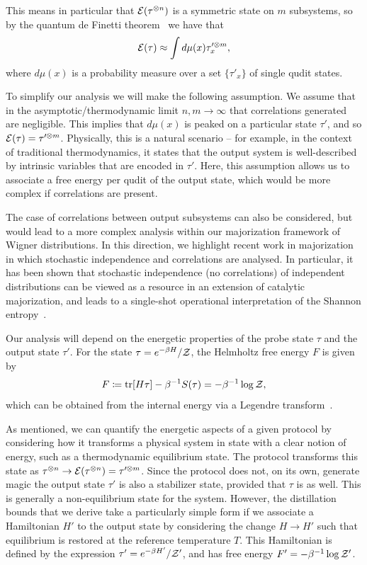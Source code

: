 \documentclass[pra,
aps,
twocolumn,
superscriptaddress,
groupedaddress,
nofootinbib,
reprint
]{revtex4-1}
\begin{document}
This means in particular that ${\mathcal E}(\tau^{\otimes n})$ is a symmetric state on $m$ subsystems, so by the quantum de Finetti theorem~\cite{christandl_2007} we have that
\begin{equation}
{\mathcal E}(\tau) \approx \int d\mu(x) \tau_x^{\prime \otimes m},
\end{equation}
where $d\mu(x)$ is a probability measure over a set $\{\tau'_x\}$ of single qudit states.

To simplify our analysis we will make the following assumption. We assume that in the asymptotic/thermodynamic limit $n,m \rightarrow \infty$ that correlations generated  are negligible. This implies that $d\mu(x)$ is peaked on a particular state $\tau'$, and so ${\mathcal E}(\tau) = \tau^{\prime \otimes m}$. Physically, this is a natural scenario -- for example, in the context of traditional thermodynamics, it states that the output system is well-described by intrinsic variables that are encoded in $\tau'$. Here, this assumption allows us to associate a free energy per qudit of the output state, which would be more complex if correlations are present.

The case of correlations between output subsystems can also be considered, but would lead to a more complex analysis within our majorization framework of Wigner distributions. In this direction, we highlight recent work in majorization in which stochastic independence and correlations are analysed. In particular, it has been shown that stochastic independence (no correlations) of independent distributions can be viewed as a resource in an extension of catalytic majorization, and leads to a single-shot operational interpretation of the Shannon entropy~\cite{muller_2015, muller_2016, muller_2019}.

Our analysis will depend on the energetic properties of the probe state $\tau$ and the output state $\tau'$.
For the state $\tau = e^{-\beta H}/\mathcal{Z}$, the Helmholtz free energy $F$ is given by
\begin{equation}
	F \coloneqq \mbox{tr}[H \tau] - \beta^{-1}S(\tau) = -\beta^{-1}\log{\mathcal{Z}},
\end{equation}
which can be obtained from the internal energy via a Legendre transform~\cite{Pathria_1997}.

As mentioned, we can quantify the energetic aspects of a given protocol by considering how it transforms a physical system in state with a clear notion of energy, such as a thermodynamic equilibrium state. The protocol transforms this state as $\tau^{\otimes n} \rightarrow {\mathcal E}(\tau^{\otimes n}) = \tau^{\prime \otimes m}$.  Since the protocol does not, on its own, generate magic the output state $\tau'$ is also a stabilizer state, provided that $\tau$ is as well. This is generally a non-equilibrium state for the system. However, the distillation bounds that we derive take a particularly simple form if we associate a Hamiltonian $H'$ to the output state by considering the change $H \rightarrow H'$ such that equilibrium is restored at the reference temperature $T$. This Hamiltonian is defined by the expression $\tau' = e^{-\beta H'}/\mathcal{Z}'$, and has free energy $F' = -\beta^{-1} \log \mathcal{Z}'$.
\end{document}
